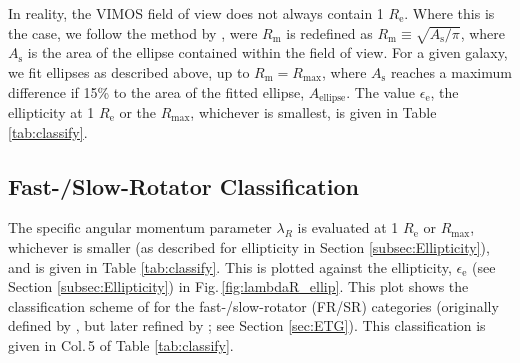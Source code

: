 			In reality, the VIMOS field of view does not always contain 1 $R_\mathrm{e}$. Where this is the case, we follow the method by \citet{Emsellem2007}, were $R_\mathrm{m}$ is redefined as $R_\mathrm{m} \equiv \sqrt{A_\mathrm{s}/\pi}$, where $A_\mathrm{s}$ is the area of the ellipse contained within the field of view. For a given galaxy, we fit ellipses as described above, up to $R_\mathrm{m} = R_\mathrm{max}$, where $A_\mathrm{s}$ reaches a maximum difference if 15\% to the area of the fitted ellipse, $A_\text{ellipse}$. The value $\epsilon_\mathrm{e}$, the ellipticity at 1 $R_\mathrm{e}$ or the $R_\text{max}$, whichever is smallest, is given in Table \ref{tab:classify}. 

		\subsection{Fast-/Slow-Rotator Classification}
			\label{subsec:FSRot}
			The specific angular momentum parameter $\lambda_R$ is evaluated at 1 $R_\mathrm{e}$ or $R_\text{max}$, whichever is smaller (as described for ellipticity in Section \ref{subsec:Ellipticity}), and is given in Table \ref{tab:classify}. This is plotted against the ellipticity, $\epsilon_\mathrm{e}$ (see Section \ref{subsec:Ellipticity}) in Fig.\,\ref{fig:lambdaR_ellip}. This plot shows the classification scheme of \citet{Cappellari2016} for the fast-/slow-rotator (FR/SR) categories (originally defined by \citealt{Emsellem2011}, but later refined by \citealt{Cappellari2016}; see Section \ref{sec:ETG}). This classification is given in Col.\,5 of Table \ref{tab:classify}.


